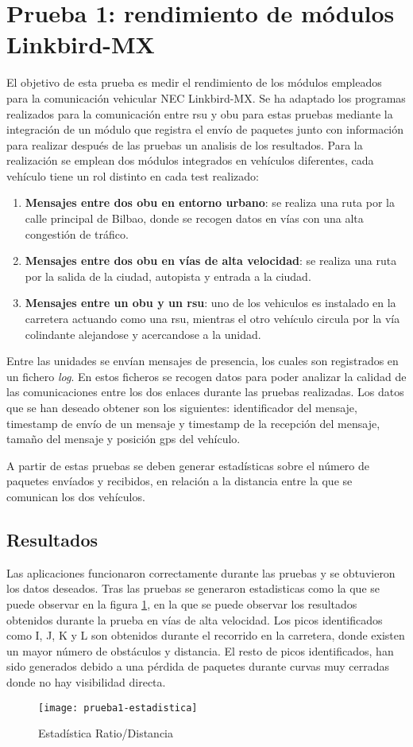\section{Prueba 1: rendimiento de módulos Linkbird-MX}
El objetivo de esta prueba es medir el rendimiento de los módulos empleados
para la comunicación vehicular NEC Linkbird-MX. Se ha adaptado los programas
realizados para la comunicación entre \gls{rsu} y \gls{obu} para estas pruebas
mediante la integración de un módulo que registra el envío de paquetes junto
con información para realizar después de las pruebas un analisis de los
resultados. Para la realización se emplean dos módulos integrados en vehículos 
diferentes, cada vehículo tiene un rol distinto en cada test realizado:

\begin{enumerate}
	\item \textbf{Mensajes entre dos \gls{obu} en entorno urbano}: se realiza
	una ruta por la calle principal de Bilbao, donde se recogen datos en
	vías con una alta congestión de tráfico.
	
	\item \textbf{Mensajes entre dos \gls{obu} en vías de alta velocidad}: se
	realiza una ruta por la salida de la ciudad, autopista y entrada a la
	ciudad.
	
	\item \textbf{Mensajes entre un \gls{obu} y un \gls{rsu}}: uno de los
	vehiculos es instalado en la carretera actuando como una \gls{rsu},
	mientras el otro vehículo circula por la vía colindante alejandose y
	acercandose a la unidad.
\end{enumerate}

Entre las unidades se envían mensajes de presencia, los cuales son registrados
en un fichero \emph{log}. En estos ficheros se recogen datos para poder analizar
la calidad de las comunicaciones entre los dos enlaces durante las pruebas
realizadas. Los datos que se han deseado obtener son los siguientes: identificador
del mensaje, timestamp de envío de un mensaje y timestamp de la recepción del
mensaje, tamaño del mensaje y posición \gls{gps} del vehículo.

A partir de estas pruebas se deben generar estadísticas sobre el número de paquetes
envíados y recibidos, en relación a la distancia entre la que se comunican los
dos vehículos.

\subsection{Resultados}
Las aplicaciones funcionaron correctamente durante las pruebas y se obtuvieron
los datos deseados. Tras las pruebas se generaron estadisticas como la que se 
puede observar en la figura \ref{fig:prueba1}, en la que se puede observar
los resultados obtenidos durante la prueba en vías de alta velocidad. Los picos
identificados como I, J, K y L son obtenidos durante el recorrido en la carretera,
donde existen un mayor número de obstáculos y distancia. El resto de picos
identificados, han sido generados debido a una pérdida de paquetes durante
curvas muy cerradas donde no hay visibilidad directa.

\begin{figure}[H]
	\begin{center}
		\texttt{[image: prueba1-estadistica]}
		\caption{Estadística Ratio/Distancia}
		\label{fig:prueba1}
	\end{center}
\end{figure}